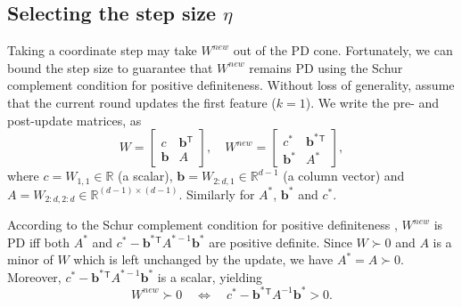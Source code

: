 \documentclass{article} %
\newcommand\mat[1]{{#1}}
\renewcommand\vec[1]{\mathbf{#1}}
\newcommand{\T}{{}^\mathsf{T}}
\newcommand{\W}{\mat{W}}
\newcommand{\newW}{{\mat{W^{new}}}}
\newcommand{\R}{\mathbb{R}}
\newcommand{\B}{\vec{b}}
\newcommand{\C}{c}
\newcommand{\invA}{A^{-1}}
\newcommand{\Wvec}{\W_{2:d,1}}
\newcommand{\Wscalar}{\W_{1,1}}
\begin{document}
\subsection{Selecting the step size $\eta$}\label{subsec:step}
Taking a coordinate step may take $\newW$ out of the PD cone. Fortunately, we can bound the step size to guarantee that $\newW$ remains PD using the Schur complement condition for positive definiteness. Without loss of generality, assume that the current round updates the first feature ($k = 1$). We write the pre- and post-update
matrices, as
\begin{equation}
  \W = \left[ \begin{matrix} \C & \B\T \\ \B & A \end{matrix} \right],
  \quad
  \newW = \left[ \begin{matrix} \C^* & \B^*\T \\ \B^* & A^* \end{matrix} \right],
  \label{schurNotationPreUpdate}
\end{equation}
 where $\C = \Wscalar \in \R$ (a scalar), $\B = \Wvec \in
\R^{d-1}$ (a column vector) and $A = \W_{2:d,2:d} \in \R^{(d-1)
\times (d-1)}$. Similarly for $A^*$, $\B^*$ and $\C^*$.


According to the Schur complement condition for positive definiteness
\citep[p. 650]{boyd2004convex}, $\newW$ is PD iff both
$A^*$ and $\C^* - \B^*\T A^{*-1} \B^*$ are positive definite.
Since $W \succ 0$ and $A$ is a minor of $\W$ which is left unchanged by the update, we have $A^* =
A \succ 0$. Moreover, $\C^* - \B^*\T A^{*-1} \B^*$ is a
scalar, yielding
\begin{equation}
  \newW \succ  0 \quad \Leftrightarrow \quad  \C^* - \B^*\T \invA \B^* >  0.
  \label{schurCond}
\end{equation}
%
\end{document}
